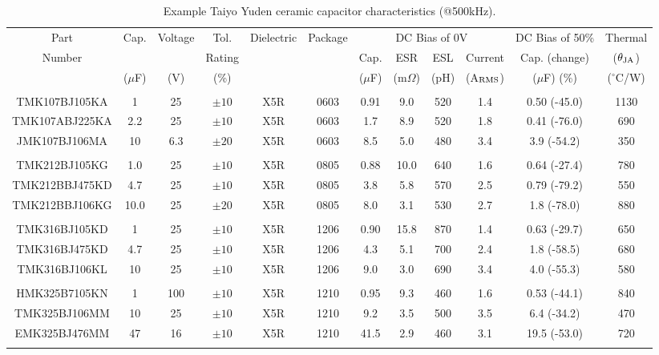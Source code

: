 \documentclass[10pt,twoside]{article}
\begin{document}
\begin{landscape}
\begin{table}[p]
\small
\caption{Example Taiyo Yuden ceramic capacitor characteristics (@500kHz).}
\label{tab:taiyo_yuden_caps}
\begin{center}
\begin{tabular}{|c|c|c|c|c|c||c|c|c|c||c||c|}
\hline
Part   & Cap. & Voltage & Tol. & Dielectric & Package &
\multicolumn{4}{c||}{DC Bias of 0V}  &
DC Bias of 50\% & Thermal\\
%
\cline{7-11}
Number &   &     & Rating     &            &         &
Cap. & ESR & ESL & Current    &
Cap. (change) & ($\theta_{\rm JA}$)\\
%
       & ($\mu$F) & (V) & (\%) & & & 
($\mu$F) & (m$\Omega$) & (pH) & (A$_{\rm RMS}$) &
($\mu$F) (\%) &($^\circ$C/W)\\
\hline\hline
&&&&&&&&&&&\\
TMK107BJ105KA &    1 & 25  & $\pm10$ & X5R & 0603 & 0.91 & 9.0 & 520 & 1.4 & 0.50 (-45.0) & 1130\\
TMK107ABJ225KA&  2.2 & 25  & $\pm10$ & X5R & 0603 & 1.7  & 8.9 & 520 & 1.8 & 0.41 (-76.0) &  690\\
JMK107BJ106MA &   10 & 6.3 & $\pm20$ & X5R & 0603 & 8.5  & 5.0 & 480 & 3.4 & 3.9  (-54.2) &  350\\
&&&&&&&&&&&\\
TMK212BJ105KG &  1.0 &  25 & $\pm10$ & X5R & 0805 & 0.88 & 10.0& 640 & 1.6 & 0.64 (-27.4) &  780\\
TMK212BBJ475KD&  4.7 &  25 & $\pm10$ & X5R & 0805 & 3.8  & 5.8 & 570 & 2.5 & 0.79 (-79.2) &  550\\
TMK212BBJ106KG& 10.0 &  25 & $\pm20$ & X5R & 0805 & 8.0  & 3.1 & 530 & 2.7 & 1.8  (-78.0) &  880\\
&&&&&&&&&&&\\
TMK316BJ105KD &    1 &  25 & $\pm10$ & X5R & 1206 & 0.90 & 15.8& 870 & 1.4 & 0.63 (-29.7) &  650\\
TMK316BJ475KD &  4.7 &  25 & $\pm10$ & X5R & 1206 & 4.3  & 5.1 & 700 & 2.4 & 1.8  (-58.5) &  680\\
TMK316BJ106KL &   10 &  25 & $\pm10$ & X5R & 1206 & 9.0  & 3.0 & 690 & 3.4 & 4.0  (-55.3) &  580\\
&&&&&&&&&&&\\
HMK325B7105KN &    1 & 100 & $\pm10$ & X5R & 1210 & 0.95 & 9.3 & 460 & 1.6 & 0.53 (-44.1) &  840\\
TMK325BJ106MM &   10 &  25 & $\pm10$ & X5R & 1210 & 9.2  & 3.5 & 500 & 3.5 & 6.4  (-34.2) &  470\\
EMK325BJ476MM &   47 &  16 & $\pm10$ & X5R & 1210 & 41.5 & 2.9 & 460 & 3.1 & 19.5 (-53.0) &  720\\
&&&&&&&&&&&\\
\hline
\end{tabular}
\end{center}
\end{table}
\end{landscape}
\end{document}
